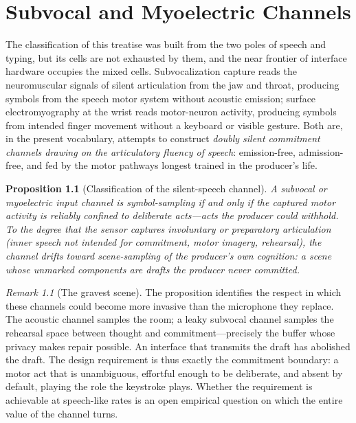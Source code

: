 \documentclass[11pt,oneside]{book}
\theoremstyle{plain}
\newtheorem{proposition}[theorem]{Proposition}
\theoremstyle{definition}
\theoremstyle{remark}
\newtheorem{remark}[theorem]{Remark}
\begin{document}
\chapter{Subvocal and Myoelectric Channels}

The classification of this treatise was built from the two poles of speech and typing, but its cells are not exhausted by them, and the near frontier of interface hardware occupies the mixed cells. Subvocalization capture reads the neuromuscular signals of silent articulation from the jaw and throat, producing symbols from the speech motor system without acoustic emission; surface electromyography at the wrist reads motor-neuron activity, producing symbols from intended finger movement without a keyboard or visible gesture. Both are, in the present vocabulary, attempts to construct \emph{doubly silent commitment channels drawing on the articulatory fluency of speech}: emission-free, admission-free, and fed by the motor pathways longest trained in the producer's life.

\begin{proposition}[Classification of the silent-speech channel]
A subvocal or myoelectric input channel is symbol-sampling if and only if the captured motor activity is reliably confined to deliberate acts---acts the producer could withhold. To the degree that the sensor captures involuntary or preparatory articulation (inner speech not intended for commitment, motor imagery, rehearsal), the channel drifts toward scene-sampling \emph{of the producer's own cognition}: a scene whose unmarked components are drafts the producer never committed.
\end{proposition}

\begin{remark}[The gravest scene]
The proposition identifies the respect in which these channels could become more invasive than the microphone they replace. The acoustic channel samples the room; a leaky subvocal channel samples the rehearsal space between thought and commitment---precisely the buffer whose privacy makes repair possible. An interface that transmits the draft has abolished the draft. The design requirement is thus exactly the commitment boundary: a motor act that is unambiguous, effortful enough to be deliberate, and absent by default, playing the role the keystroke plays. Whether the requirement is achievable at speech-like rates is an open empirical question on which the entire value of the channel turns.
\end{remark}
\end{document}
